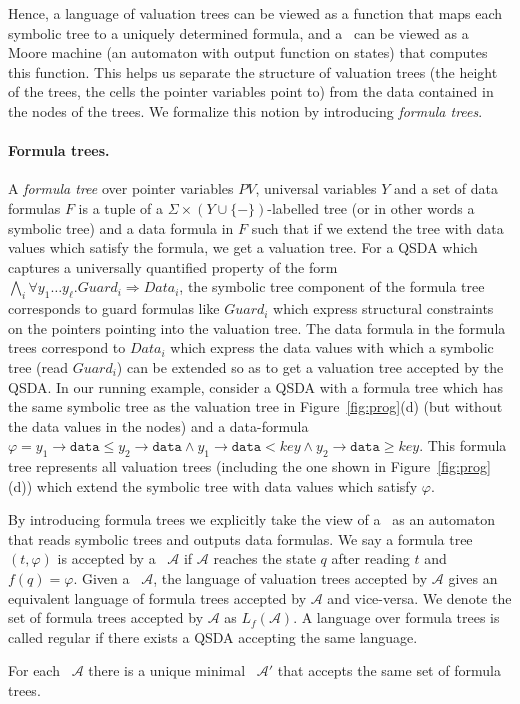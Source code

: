 \documentclass{llncs}
\newcommand{\A}{\mathcal{A}}
\newcommand{\yblank}{-}
\newcommand{\data}{\texttt{data}}
\begin{document}
Hence, a language of valuation trees can be viewed as a function that
maps each symbolic tree to a uniquely determined formula, and a \QSDA\ can be viewed as a
Moore machine (an automaton with output function on states) that
computes this function.
This helps us separate the structure of valuation trees (the height of the trees, the cells the pointer variables point to) from the data contained in the nodes of the trees. We formalize this notion by introducing \emph{formula trees}.



\paragraph{\bf Formula trees.}
A \emph{formula tree} over pointer variables $PV$, universal variables $Y$ and a set of data formulas $F$ is a tuple of a $\Sigma \times (Y \cup \{\yblank\})$-labelled tree (or in other words a symbolic tree) and a data formula in $F$ such that if we extend the tree with data values which satisfy the formula, we get a valuation tree.
For a QSDA which captures a universally quantified property of the form $\bigwedge_i \forall y_1 \ldots y_\ell. Guard_i \Rightarrow Data_i$, the symbolic tree component of the formula tree corresponds to guard formulas like $Guard_i$ which express structural constraints on the pointers pointing into the valuation tree.
The data formula in the formula trees correspond to $Data_i$ which express the data values with which a symbolic tree (read $Guard_i$) can be extended so as to get a valuation tree accepted by the QSDA.
In our running example, consider a QSDA with a formula tree which has the same symbolic tree as the valuation tree in Figure~\ref{fig:prog}(d) (but without the data values in the nodes) and a data-formula $\varphi = y_1\rightarrow\data \leq y_2\rightarrow\data \wedge y_1\rightarrow\data < key \wedge y_2\rightarrow\data \geq key$.
This formula tree represents all valuation trees (including the one shown in Figure~\ref{fig:prog}(d)) which extend the symbolic tree with data values which satisfy $\varphi$.





By introducing formula trees we explicitly take the view of a \QSDA\ as an automaton that reads symbolic trees and outputs data formulas.
We say a formula tree $(t, \varphi)$ is accepted by a \QSDA\ $\mathcal A$ if $\mathcal A$ reaches the state $q$ after reading $t$ and $f(q) = \varphi$.
Given a \QSDA\ $\A$, the language of valuation trees accepted by $\A$ gives an equivalent language of formula trees accepted by $\A$ and vice-versa. We denote the set of formula trees accepted by $\A$ as $L_f(\A)$. A language over formula trees is called regular if there exists a QSDA accepting the same language.
\begin{theorem}\label{thm-formula-trees}
For each \QSDA\ $\A$ there is a unique minimal \QSDA\ $\A'$ that accepts the
same set of formula trees.
\end{theorem}
\end{document}
